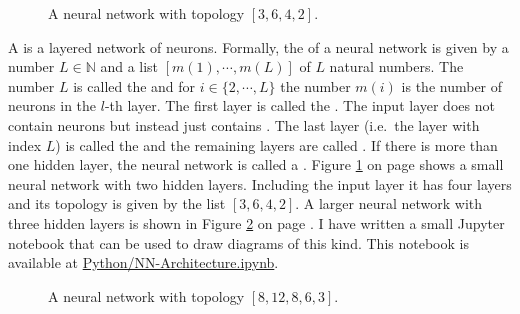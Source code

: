 \begin{figure}[!h]
  \centering
   \caption{A neural network with topology $[3, 6, 4, 2]$.}
  \label{fig:nn1.pdf}
\end{figure}

A  is a layered network of neurons.  Formally, the  of a neural network is
given by a number $L \in \mathbb{N}$ and a list $[m(1), \cdots, m(L)]$ of $L$ natural numbers.  The number
$L$ is called the  and for $i \in \{2,\cdots,L\}$ the number $m(i)$ is the number of
neurons in the $l$-th layer.  The first layer is called the .  The input layer does not contain
neurons but instead just contains .  The last layer (i.e.~the
layer with index $L$) is called the  and the remaining layers are called 
.  If there is more than one hidden layer, the neural network is called a
.  Figure \ref{fig:nn1.pdf} on page \pageref{fig:nn1.pdf} shows
a small neural network with two hidden layers.  Including the input layer it has four layers and its topology
is given by the list $[3, 6, 4, 2]$.  A larger neural network with three hidden layers is shown in Figure
\ref{fig:nn2.pdf} on page \pageref{fig:nn2.pdf}.  I have written a small Jupyter notebook that can be used to
draw diagrams of this kind. This notebook is available at
\href{https://github.com/karlstroetmann/Artificial-Intelligence/blob/master/Python/NN-Architecture.ipynb}{Python/NN-Architecture.ipynb}. 


\begin{figure}[!h]
  \centering
   \caption{A neural network with topology $[8, 12, 8, 6, 3]$.}
  \label{fig:nn2.pdf}
\end{figure}


